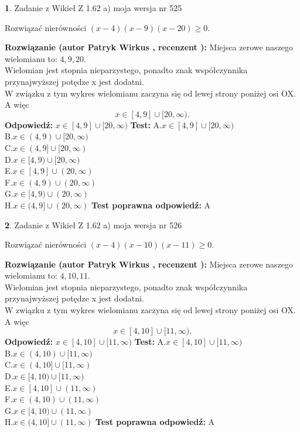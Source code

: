 \documentclass[12pt, a4paper]{article}
\theoremstyle{definition} %
\newtheorem{zad}{}
\newcommand{\zadStart}[1]{\begin{zad}#1\newline}
\newcommand{\zadStop}{\end{zad}}
\newcommand{\rozwStart}[2]{\noindent \textbf{Rozwiązanie (autor #1 , recenzent #2): }\newline}
\newcommand{\rozwStop}{\newline}
\newcommand{\odpStart}{\noindent \textbf{Odpowiedź:}\newline}
\newcommand{\odpStop}{\newline}
\newcommand{\testStart}{\noindent \textbf{Test:}\newline}
\newcommand{\testStop}{\newline}
\newcommand{\kluczStart}{\noindent \textbf{Test poprawna odpowiedź:}\newline}
\newcommand{\kluczStop}{\newline}
\begin{document}
\zadStart{Zadanie z Wikieł Z 1.62 a) moja wersja nr 525}

Rozwiązać nierówności $(x-4)(x-9)(x-20)\ge0$.
\zadStop
\rozwStart{Patryk Wirkus}{}
Miejsca zerowe naszego wielomianu to: $4, 9, 20$.\\
Wielomian jest stopnia nieparzystego, ponadto znak współczynnika przy\linebreak najwyższej potędze x jest dodatni.\\ W związku z tym wykres wielomianu zaczyna się od lewej strony poniżej osi OX. A więc $$x \in [4,9] \cup [20,\infty).$$
\rozwStop
\odpStart
$x \in [4,9] \cup [20,\infty)$
\odpStop
\testStart
A.$x \in [4,9] \cup [20,\infty)$\\
B.$x \in (4,9) \cup [20,\infty)$\\
C.$x \in (4,9] \cup [20,\infty)$\\
D.$x \in [4,9) \cup [20,\infty)$\\
E.$x \in [4,9] \cup (20,\infty)$\\
F.$x \in (4,9) \cup (20,\infty)$\\
G.$x \in [4,9) \cup (20,\infty)$\\
H.$x \in (4,9] \cup (20,\infty)$
\testStop
\kluczStart
A
\kluczStop



\zadStart{Zadanie z Wikieł Z 1.62 a) moja wersja nr 526}

Rozwiązać nierówności $(x-4)(x-10)(x-11)\ge0$.
\zadStop
\rozwStart{Patryk Wirkus}{}
Miejsca zerowe naszego wielomianu to: $4, 10, 11$.\\
Wielomian jest stopnia nieparzystego, ponadto znak współczynnika przy\linebreak najwyższej potędze x jest dodatni.\\ W związku z tym wykres wielomianu zaczyna się od lewej strony poniżej osi OX. A więc $$x \in [4,10] \cup [11,\infty).$$
\rozwStop
\odpStart
$x \in [4,10] \cup [11,\infty)$
\odpStop
\testStart
A.$x \in [4,10] \cup [11,\infty)$\\
B.$x \in (4,10) \cup [11,\infty)$\\
C.$x \in (4,10] \cup [11,\infty)$\\
D.$x \in [4,10) \cup [11,\infty)$\\
E.$x \in [4,10] \cup (11,\infty)$\\
F.$x \in (4,10) \cup (11,\infty)$\\
G.$x \in [4,10) \cup (11,\infty)$\\
H.$x \in (4,10] \cup (11,\infty)$
\testStop
\kluczStart
A
\kluczStop
\end{document}
